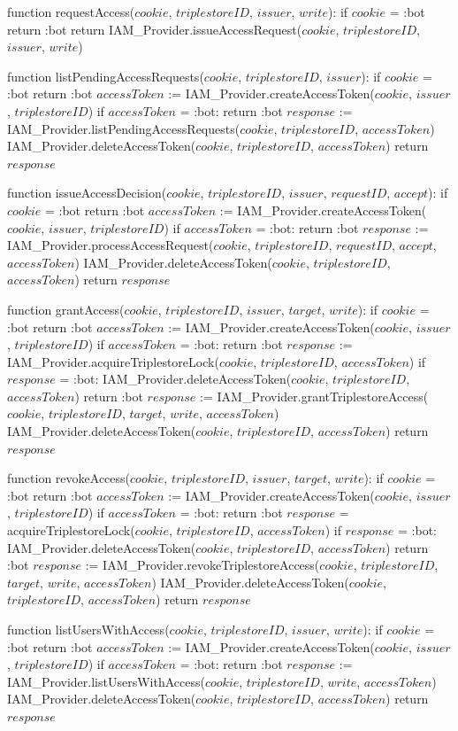 function requestAccess($cookie$, $triplestoreID$, $issuer$, $write$):
    if $cookie$ = :bot
        return :bot
    return IAM_Provider.issueAccessRequest($cookie$, $triplestoreID$, $issuer$, $write$)

function listPendingAccessRequests($cookie$, $triplestoreID$, $issuer$):
    if $cookie$ = :bot
        return :bot
    $accessToken$ := IAM_Provider.createAccessToken($cookie$, $issuer$, $triplestoreID$)
    if $accessToken$ = :bot:
        return :bot
    $response$ := IAM_Provider.listPendingAccessRequests($cookie$, $triplestoreID$, $accessToken$)
    IAM_Provider.deleteAccessToken($cookie$, $triplestoreID$, $accessToken$)
    return $response$

function issueAccessDecision($cookie$, $triplestoreID$, $issuer$, $requestID$, $accept$):
    if $cookie$ = :bot
        return :bot
    $accessToken$ := IAM_Provider.createAccessToken($cookie$, $issuer$, $triplestoreID$)
    if $accessToken$ = :bot:
        return :bot
    $response$ := IAM_Provider.processAccessRequest($cookie$, $triplestoreID$, $requestID$, $accept$, $accessToken$)
    IAM_Provider.deleteAccessToken($cookie$, $triplestoreID$, $accessToken$)
    return $response$

function grantAccess($cookie$, $triplestoreID$, $issuer$, $target$, $write$):
    if $cookie$ = :bot
        return :bot
    $accessToken$ := IAM_Provider.createAccessToken($cookie$, $issuer$, $triplestoreID$)
    if $accessToken$ = :bot:
        return :bot
    $response$ := IAM_Provider.acquireTriplestoreLock($cookie$, $triplestoreID$, $accessToken$)
    if $response$ = :bot: 
        IAM_Provider.deleteAccessToken($cookie$, $triplestoreID$, $accessToken$)
        return :bot
    $response$ := IAM_Provider.grantTriplestoreAccess($cookie$, $triplestoreID$, $target$, $write$, $accessToken$)
    IAM_Provider.deleteAccessToken($cookie$, $triplestoreID$, $accessToken$)
    return $response$

function revokeAccess($cookie$, $triplestoreID$, $issuer$, $target$, $write$):
    if $cookie$ = :bot
        return :bot
    $accessToken$ := IAM_Provider.createAccessToken($cookie$, $issuer$, $triplestoreID$)
    if $accessToken$ = :bot:
        return :bot
    $response$ = acquireTriplestoreLock($cookie$, $triplestoreID$, $accessToken$)
    if $response$ = :bot: 
        IAM_Provider.deleteAccessToken($cookie$, $triplestoreID$, $accessToken$)
        return :bot
    $response$ := IAM_Provider.revokeTriplestoreAccess($cookie$, $triplestoreID$, $target$, $write$, $accessToken$)
    IAM_Provider.deleteAccessToken($cookie$, $triplestoreID$, $accessToken$)
    return $response$

function listUsersWithAccess($cookie$, $triplestoreID$, $issuer$, $write$):
    if $cookie$ = :bot
        return :bot
    $accessToken$ := IAM_Provider.createAccessToken($cookie$, $issuer$, $triplestoreID$)
    if $accessToken$ = :bot:
        return :bot
    $response$ := IAM_Provider.listUsersWithAccess($cookie$, $triplestoreID$, $write$, $accessToken$)
    IAM_Provider.deleteAccessToken($cookie$, $triplestoreID$, $accessToken$)
    return $response$
    
